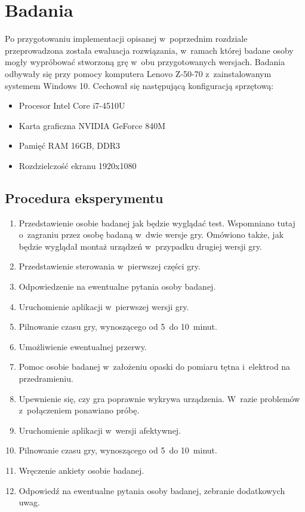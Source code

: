 \chapter{Badania}
\label{cha:badania}
Po przygotowaniu implementacji opisanej w~poprzednim rozdziale przeprowadzona została ewaluacja rozwiązania, w~ramach której badane osoby mogły wypróbować stworzoną grę w~obu przygotowanych wersjach. Badania odbywały się przy pomocy komputera Lenovo Z-50-70 z~zainstalowanym systemem Windows 10. Cechował się następującą konfiguracją sprzętową:
\begin{itemize}
	\item Procesor Intel Core i7-4510U
	\item Karta graficzna NVIDIA GeForce 840M
	\item Pamięć RAM 16GB, DDR3
	\item Rozdzielczość ekranu 1920x1080
\end{itemize}
\section{Procedura eksperymentu}
\begin{enumerate}
	\item Przedstawienie osobie badanej jak będzie wyglądać test. Wspomniano tutaj o~zagraniu przez osobę badaną w~dwie wersje gry. Omówiono także, jak będzie wyglądał montaż urządzeń w~przypadku drugiej wersji gry. 
	\item Przedstawienie sterowania w~pierwszej części gry.
	\item Odpowiedzenie na ewentualne pytania osoby badanej.
	\item Uruchomienie aplikacji w~pierwszej wersji gry.
	\item Pilnowanie czasu gry, wynoszącego od 5~do 10~minut.
	\item Umożliwienie ewentualnej przerwy.
	\item Pomoc osobie badanej w~założeniu opaski do pomiaru tętna i~elektrod na przedramieniu.
	\item Upewnienie się, czy gra poprawnie wykrywa urządzenia. W~razie problemów z~połączeniem ponawiano próbę.
	\item Uruchomienie aplikacji w~wersji afektywnej.
	\item Pilnowanie czasu gry, wynoszącego od 5~do 10~minut.
	\item Wręczenie ankiety osobie badanej.
	\item Odpowiedź na ewentualne pytania osoby badanej, zebranie dodatkowych uwag.
\end{enumerate}
